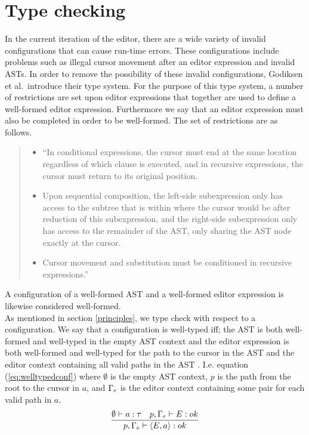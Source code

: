 \section{Type checking}
\label{type-checking}
In the current iteration of the editor, there are a wide variety of invalid
configurations that can cause run-time errors. These configurations include
problems such as illegal cursor movement after an editor expression and invalid
ASTs. In order to remove the possibility of these invalid configurations,
Godiksen et al.\pepm ~introduce their type system. For the purpose of this type
system, a number of restrictions are set upon editor expressions that together
are used to define a well-formed editor expression. Furthermore we say that an
editor expression must also be completed in order to be well-formed. The set of
restrictions are as follows.
\begin{quote}
    \begin{itemize}
        \item ``In conditional expressions, the cursor must end at the same
              location regardless of which clause is executed, and in
              recursive expressions, the cursor must return to its original
              position.
        \item Upon sequential composition, the left-side subexpression
              only has access to the subtree that is within where the
              cursor would be after reduction of this subexpression,
              and the right-side subexpression only has access to the
              remainder of the AST, only sharing the AST node exactly
              at the cursor.
        \item Cursor movement and substitution must be conditioned in
              recursive expressions.''\pepm
      \end{itemize}
\end{quote}


A configuration of a well-formed AST and a well-formed editor expression is
likewise considered well-formed.\\

As mentioned in section \ref{principles}, we type check with respect to a
configuration. We say that a configuration is well-typed iff; the AST is both
well-formed and well-typed in the empty AST context and the editor expression
is both well-formed and well-typed for the path to the cursor in the AST and
the editor context containing all valid paths in the AST \pepm. I.e. equation
(\ref{eq:welltypedconf}) where $\emptyset$ is the empty AST context, $p$ is the
path from the root to the cursor in $a$, and $\Gamma_{e}$ is the editor context
containing some pair for each valid path in $a$. \\
\begin{equation}\label{eq:welltypedconf}
  \frac{\emptyset \vdash a : \tau \quad p,\Gamma_{e} \vdash E : ok} {p,\Gamma_{e} \vdash \langle E,a \rangle : ok}\\ 
\end{equation}

